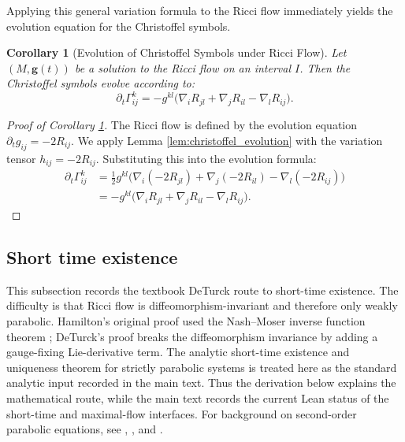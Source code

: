 \documentclass[11pt]{article}
\theoremstyle{plain}
\newtheorem{corollary}[theorem]{Corollary}
\theoremstyle{definition}
\theoremstyle{remark}
\begin{document}
Applying this general variation formula to the Ricci flow immediately yields the evolution equation for the Christoffel symbols.

\begin{corollary}[Evolution of Christoffel Symbols under Ricci Flow]
\label{cor:christoffel_evolution_RF}
    Let $(M, \mathbf{g}(t))$ be a solution to the Ricci flow on an interval $I$. Then the Christoffel symbols evolve according to:
    \begin{equation}
        \partial_t \Gamma_{ij}^k = - g^{kl} \big( \nabla_i R_{jl} + \nabla_j R_{il} - \nabla_l R_{ij} \big).
    \end{equation}
\end{corollary}

\begin{proof}[Proof of Corollary \ref{cor:christoffel_evolution_RF}]
    The Ricci flow is defined by the evolution equation $\partial_t g_{ij} = -2 R_{ij}$. We apply Lemma \ref{lem:christoffel_evolution} with the variation tensor $h_{ij} = -2 R_{ij}$.
    Substituting this into the evolution formula:
    \begin{align*}
        \partial_t \Gamma_{ij}^k &= \frac{1}{2} g^{kl} \big( \nabla_i (-2 R_{jl}) + \nabla_j (-2 R_{il}) - \nabla_l (-2 R_{ij}) \big) \\
        &= - g^{kl} \big( \nabla_i R_{jl} + \nabla_j R_{il} - \nabla_l R_{ij} \big).
    \end{align*}
\end{proof}

\subsection{Short time existence}\label{subsec:ShortTimeExistence}

This subsection records the textbook DeTurck route to short-time existence.
The difficulty is that Ricci flow is diffeomorphism-invariant and therefore only
weakly parabolic.  Hamilton's original proof used the Nash--Moser inverse
function theorem \cite[\S 4--6]{MR664497}; DeTurck's proof
\cite{MR697987,DeTurck2003} breaks the diffeomorphism invariance by adding a
gauge-fixing Lie-derivative term.  The analytic short-time existence and
uniqueness theorem for strictly parabolic systems is treated here as the
standard analytic input recorded in the main text.  Thus the derivation below
explains the mathematical route, while the main text records the current Lean
status of the short-time and maximal-flow interfaces.  For background on
second-order parabolic equations, see \cite{MR181836}, \cite{MR241822}, and
\cite{MR1465184}.
\end{document}
